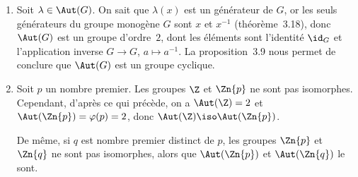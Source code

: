 \begin{enumerate}
  \item %
    Soit $\lambda\in\Aut(G)$.
    On sait que $\lambda(x)$ est un générateur de $G$, or les seuls générateurs du groupe monogène $G$ sont $x$ et $x^{-1}$ (théorème~3.18), donc $\Aut(G)$ est un groupe d'ordre~$2$, dont les éléments sont l'identité $\id_G$ et l'application inverse $G\to G$, $a\mapsto a^{-1}$.
    La proposition~3.9 nous permet de conclure que $\Aut(G)$ est un groupe cyclique.

  \item %
    Soit $p$ un nombre premier.
    Les groupes $\Z$ et $\Zn{p}$ ne sont pas isomorphes.
    Cependant, d'après ce qui précède, on a $\Aut(\Z) = 2$ et $\Aut(\Zn{p}) = \varphi(p) = 2$, donc $\Aut(\Z)\iso\Aut(\Zn{p})$.

    De même, si $q$ est nombre premier distinct de $p$, les groupes $\Zn{p}$ et $\Zn{q}$ ne sont pas isomorphes, alors que $\Aut(\Zn{p})$ et $\Aut(\Zn{q})$ le sont.
\end{enumerate}
